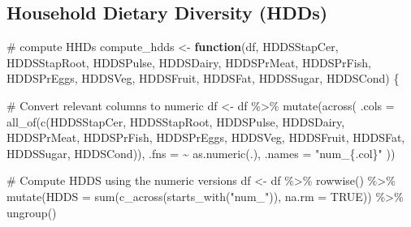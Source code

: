 \documentclass[
  letterpaper,
  DIV=11,
  numbers=noendperiod]{scrreprt}
\newenvironment{Shaded}{\begin{snugshade}}{\end{snugshade}}
\newcommand{\AttributeTok}[1]{\textcolor[rgb]{0.40,0.45,0.13}{#1}}
\newcommand{\CommentTok}[1]{\textcolor[rgb]{0.37,0.37,0.37}{#1}}
\newcommand{\ConstantTok}[1]{\textcolor[rgb]{0.56,0.35,0.01}{#1}}
\newcommand{\ControlFlowTok}[1]{\textcolor[rgb]{0.00,0.23,0.31}{\textbf{#1}}}
\newcommand{\FunctionTok}[1]{\textcolor[rgb]{0.28,0.35,0.67}{#1}}
\newcommand{\NormalTok}[1]{\textcolor[rgb]{0.00,0.23,0.31}{#1}}
\newcommand{\OtherTok}[1]{\textcolor[rgb]{0.00,0.23,0.31}{#1}}
\newcommand{\SpecialCharTok}[1]{\textcolor[rgb]{0.37,0.37,0.37}{#1}}
\newcommand{\StringTok}[1]{\textcolor[rgb]{0.13,0.47,0.30}{#1}}
\begin{document}
\subsection{Household Dietary Diversity
(HDDs)}\label{household-dietary-diversity-hdds}

\begin{Shaded}
\begin{Highlighting}[]
\CommentTok{\# compute HHDs}
\NormalTok{compute\_hdds }\OtherTok{\textless{}{-}} \ControlFlowTok{function}\NormalTok{(df,}
\NormalTok{                         HDDSStapCer,}
\NormalTok{                         HDDSStapRoot,}
\NormalTok{                         HDDSPulse,}
\NormalTok{                         HDDSDairy,}
\NormalTok{                         HDDSPrMeat,}
\NormalTok{                         HDDSPrFish,}
\NormalTok{                         HDDSPrEggs,}
\NormalTok{                         HDDSVeg,}
\NormalTok{                         HDDSFruit,}
\NormalTok{                         HDDSFat,}
\NormalTok{                         HDDSSugar,}
\NormalTok{                         HDDSCond) \{}
  
  \CommentTok{\# Convert relevant columns to numeric}
\NormalTok{  df }\OtherTok{\textless{}{-}}\NormalTok{ df }\SpecialCharTok{\%\textgreater{}\%}
    \FunctionTok{mutate}\NormalTok{(}\FunctionTok{across}\NormalTok{(}
      \AttributeTok{.cols =} \FunctionTok{all\_of}\NormalTok{(}\FunctionTok{c}\NormalTok{(HDDSStapCer, HDDSStapRoot, HDDSPulse, HDDSDairy,}
\NormalTok{                       HDDSPrMeat, HDDSPrFish, HDDSPrEggs, HDDSVeg,}
\NormalTok{                       HDDSFruit, HDDSFat, HDDSSugar, HDDSCond)),}
      \AttributeTok{.fns =} \SpecialCharTok{\textasciitilde{}} \FunctionTok{as.numeric}\NormalTok{(.),}
      \AttributeTok{.names =} \StringTok{"num\_\{.col\}"}
\NormalTok{    ))}
  
  \CommentTok{\# Compute HDDS using the numeric versions}
\NormalTok{  df }\OtherTok{\textless{}{-}}\NormalTok{ df }\SpecialCharTok{\%\textgreater{}\%}
    \FunctionTok{rowwise}\NormalTok{() }\SpecialCharTok{\%\textgreater{}\%}
    \FunctionTok{mutate}\NormalTok{(}\AttributeTok{HDDS =} \FunctionTok{sum}\NormalTok{(}\FunctionTok{c\_across}\NormalTok{(}\FunctionTok{starts\_with}\NormalTok{(}\StringTok{"num\_"}\NormalTok{)), }\AttributeTok{na.rm =} \ConstantTok{TRUE}\NormalTok{)) }\SpecialCharTok{\%\textgreater{}\%}
    \FunctionTok{ungroup}\NormalTok{()}
  

\end{Highlighting}
\end{Shaded}
\end{document}

